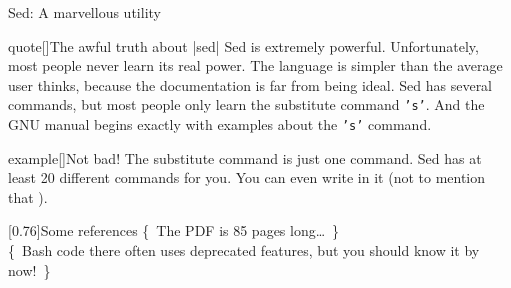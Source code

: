 
\begin{frame}{Sed: A marvellous utility}
    \vspace{-3mm}
    \begin{varblock}{quote}[\textwidth]{The awful truth about \bash|sed|}
        \textnormal{Sed is extremely powerful.
        Unfortunately, most people never learn its real power.
        The language is simpler than the average user thinks, because the documentation is far from being ideal.
        Sed has several commands, but most people only learn the substitute command \texttt{'s'}.
        And the GNU manual begins exactly with examples about the \texttt{'s'} command.}
    \end{varblock}
    \vspace{-1mm}
    \begin{varblock}{example}[\textwidth]{Not bad!}
        The substitute command is just one command.
        Sed has at least 20 different commands for you.
        You can even write  in it (not to mention that ).
    \end{varblock}
    \vspace{-1mm}
    \begin{varblock*}{}[0.76\textwidth]{Some references}
         {\tiny\{~The PDF is 85 pages long\ldots~\}}\\
         {\tiny\{~Bash code there often uses deprecated features, but you should know it by now!~\}}\\
        \\
    \end{varblock*}
\end{frame}
